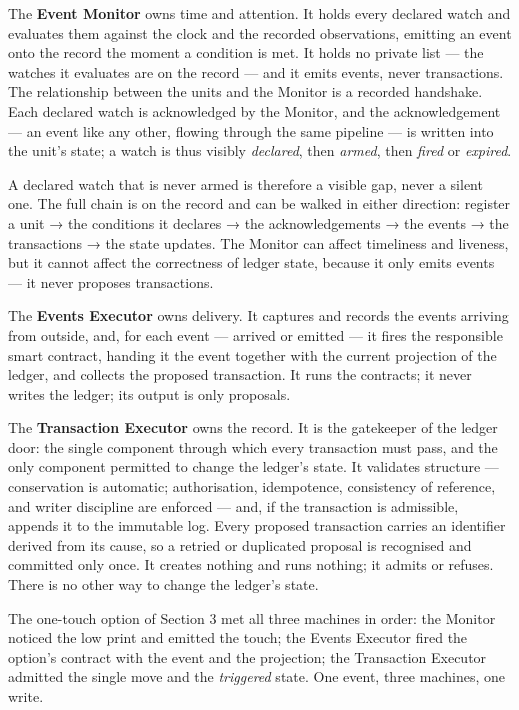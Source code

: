 \documentclass[11pt,a4paper]{article}
\newcommand{\clabel}[1]{\leavevmode\hypertarget{clause-#1}{}%
  \marginpar{\raggedright\scriptsize\ttfamily\textcolor{gray}{#1}}}
\begin{document}
\clabel{C-5.2}The \textbf{Event Monitor} owns time and attention. It holds every
declared watch and evaluates them against the clock and the recorded
observations, emitting an event onto the record the moment a condition
is met. It holds no private list --- the watches it evaluates are on the
record --- and it emits events, never transactions. The relationship
between the units and the Monitor is a recorded handshake. Each declared
watch is acknowledged by the Monitor, and the acknowledgement --- an
event like any other, flowing through the same pipeline --- is written
into the unit's state; a watch is thus visibly \emph{declared}, then
\emph{armed}, then \emph{fired} or \emph{expired}.

\clabel{C-5.3}A declared watch that is never armed is therefore a visible gap, never a
silent one. The full chain is on the record and can be walked in either
direction: register a unit → the conditions it declares → the
acknowledgements → the events → the transactions → the state updates.
The Monitor can affect timeliness and liveness, but it cannot affect the
correctness of ledger state, because it only emits events --- it never
proposes transactions.

\clabel{C-5.4}The \textbf{Events Executor} owns delivery. It captures and records the
events arriving from outside, and, for each event --- arrived or emitted
--- it fires the responsible smart contract, handing it the event
together with the current projection of the ledger, and collects the
proposed transaction. It runs the contracts; it never writes the ledger;
its output is only proposals.

\clabel{C-5.5}The \textbf{Transaction Executor} owns the record. It is the gatekeeper
of the ledger door: the single component through which every transaction
must pass, and the only component permitted to change the ledger's
state. It validates structure --- conservation is automatic;
authorisation, idempotence, consistency of reference, and writer
discipline are enforced --- and, if the transaction is admissible,
appends it to the immutable log. \clabel{C-5.6}Every proposed transaction carries an
identifier derived from its cause, so a retried or duplicated proposal
is recognised and committed only once. It creates nothing and runs
nothing; it admits or refuses. There is no other way to change the
ledger's state.

The one-touch option of Section 3 met all three machines in order: the
Monitor noticed the low print and emitted the touch; the Events Executor
fired the option's contract with the event and the projection; the
Transaction Executor admitted the single move and the \emph{triggered}
state. One event, three machines, one write.
\end{document}
